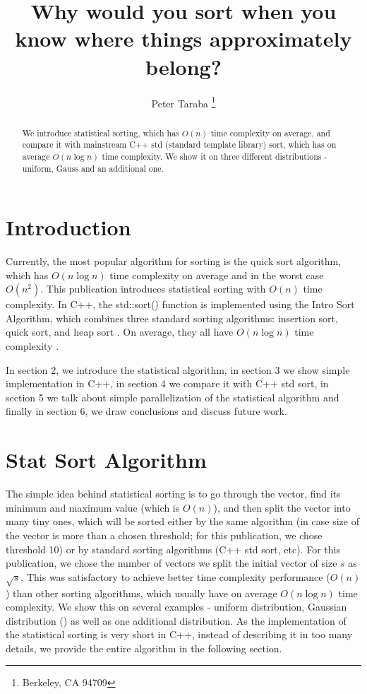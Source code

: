 \documentclass[12pt]{article}
\title{Why would you sort when you know where things approximately belong?}
\author{Peter Taraba \footnote{Berkeley, CA 94709}}
\begin{document}
	
	\maketitle
	
	\begin{abstract}
  		We introduce statistical sorting, which has $O(n)$ time complexity on average, and compare it with mainstream C++ std (standard template library) sort, which has on average $O(n \log n)$ time complexity. We show it on three different distributions - uniform, Gauss and an additional one.
	\end{abstract}
	
	\section{Introduction}
	
		Currently, the most popular algorithm for sorting is the quick sort algorithm, which has $O(n \log n)$ time complexity on average \cite{numrec} and in the worst case $O(n^2)$. This publication introduces statistical sorting with $O(n)$ time complexity. In C++, the std::sort() function is implemented using the Intro Sort Algorithm, which combines three standard sorting algorithms: insertion sort, quick sort, and heap sort \cite{cppsort}. On average, they all have $O(n \log n)$ time complexity \cite{wikisort}.
		
		In section 2, we introduce the statistical algorithm, in section 3 we show simple implementation in C++, in section 4 we compare it with C++ std sort, in section 5 we talk about simple parallelization of the statistical algorithm and finally in section 6, we draw conclusions and discuss future work.

	\section{Stat Sort Algorithm}
	
		The simple idea behind statistical sorting is to go through the vector, find its minimum and maximum value (which is $O(n)$), and then split the vector into many tiny ones, which will be sorted either by the same algorithm (in case size of the vector is more than a chosen threshold; for this publication, we chose threshold 10) or by standard sorting algorithms (C++ std sort, etc). For this publication, we chose the number of vectors we split the initial vector of size $s$ as $\sqrt{s}$. This was satisfactory to achieve better time complexity performance ($O(n)$) than other sorting algorithms, which usually have on average $O(n \log n)$ time complexity. We show this on several examples - uniform distribution, Gaussian distribution (\cite{gauss}) as well as one additional distribution. As the implementation of the statistical sorting is very short in C++, instead of describing it in too many details, we provide the entire algorithm in the following section.
		
\end{document}
